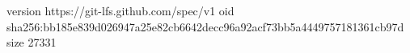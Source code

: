 version https://git-lfs.github.com/spec/v1
oid sha256:bb185e839d026947a25e82cb6642decc96a92acf73bb5a4449757181361cb97d
size 27331
